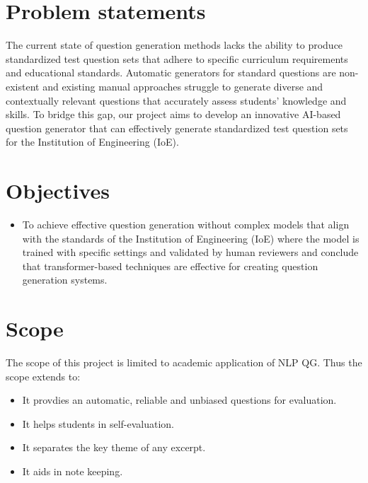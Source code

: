 \documentclass[12pt]{report}
\begin{document}
\section{Problem statements}
The current state of question generation methods lacks the ability to produce standardized test question sets that adhere to specific curriculum requirements and educational standards. Automatic generators for standard questions are non-existent and existing manual approaches struggle to generate diverse and contextually relevant questions that accurately assess students' knowledge and skills. To bridge this gap, our project aims to develop an innovative AI-based question generator that can effectively generate standardized test question sets for the Institution of Engineering (IoE).

\section{Objectives}
\begin{itemize}
    \item To achieve effective question generation without complex models that align with the standards of the Institution of Engineering (IoE) where the model is trained with specific settings and validated by human reviewers and conclude that transformer-based techniques are effective for creating question generation systems.
\end{itemize}
\section{Scope}
The scope of this project is limited to academic application of NLP QG. Thus the scope extends to:
\begin{itemize}
    \item It provdies an automatic, reliable and unbiased questions for evaluation.
    \item It helps students in self-evaluation.
    \item It separates the key theme of any excerpt.
    \item It aids in note keeping.
    
\end{itemize}
\end{document}
